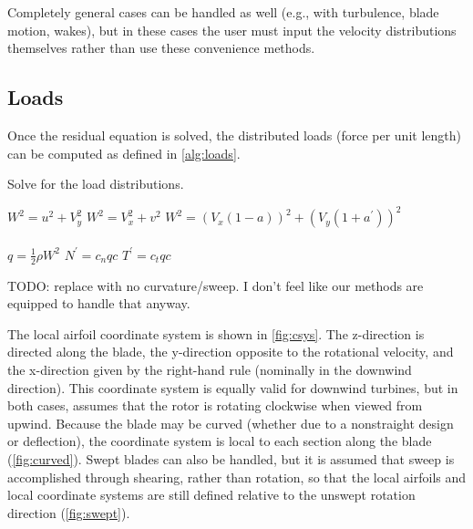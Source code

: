 \documentclass{article}
\begin{document}
Completely general cases can be handled as well (e.g., with turbulence, blade motion, wakes), but in these cases the user must input the velocity distributions themselves rather than use these convenience methods.


\subsection{Loads}

Once the residual equation is solved, the distributed loads (force per unit length) can be computed as defined in \cref{alg:loads}.
\begin{algorithm}[htbp]
\caption{Solve for the load distributions.}
\begin{algorithmic}
\State $W^2 = u^2 + V_y^2$
\State $W^2 = V_x^2 + v^2$
\Else
\State $W^2 = (V_x(1 - a))^2 + (V_y(1 + a^\prime))^2$
\EndIf
\\
\\
\State $q = \frac{1}{2}\rho W^2$
\State $N^\prime = c_n q c$
\State $T^\prime = c_t q c$

\end{algorithmic}
\label{alg:loads}
\end{algorithm}

TODO: replace with no curvature/sweep.  I don't feel like our methods are equipped to handle that anyway.

The local airfoil coordinate system is shown in \cref{fig:csys}.  The z-direction is directed along the blade, the y-direction opposite to the rotational velocity, and the x-direction given by the right-hand rule (nominally in the downwind direction).  This coordinate system is equally valid for downwind turbines, but in both cases, assumes that the rotor is rotating clockwise when viewed from upwind.  Because the blade may be curved (whether due to a nonstraight design or deflection), the coordinate system is local to each section along the blade (\cref{fig:curved}).  Swept blades can also be handled, but it is assumed that sweep is accomplished through shearing, rather than rotation, so that the local airfoils and local coordinate systems are still defined relative to the unswept rotation direction (\cref{fig:swept}).
\end{document}
